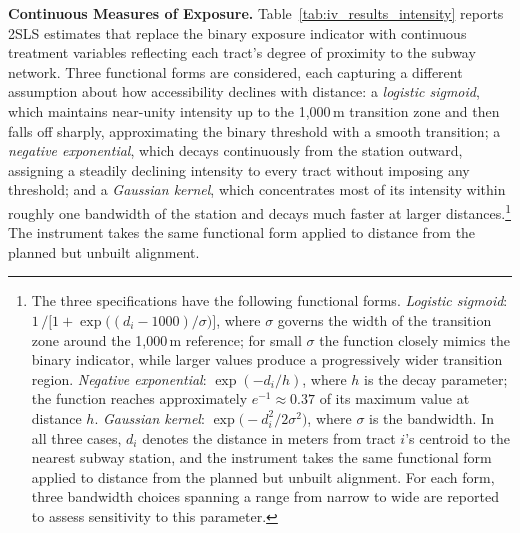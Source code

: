 \noindent
\textbf{Continuous Measures of Exposure.} Table~\ref{tab:iv_results_intensity} reports 2SLS estimates that replace the binary exposure indicator with continuous treatment variables reflecting each tract's degree of proximity to the subway network. Three functional forms are considered, each capturing a different assumption about how accessibility declines with distance: a \textit{logistic sigmoid}, which maintains near-unity intensity up to the 1,000\,m transition zone and then falls off sharply, approximating the binary threshold with a smooth transition; a \textit{negative exponential}, which decays continuously from the station outward, assigning a steadily declining intensity to every tract without imposing any threshold; and a \textit{Gaussian kernel}, which concentrates most of its intensity within roughly one bandwidth of the station and decays much faster at larger distances.\footnote{The three specifications have the following functional forms. \textit{Logistic sigmoid}: $1\,/\bigl[1 + \exp\bigl((d_i - 1000)/\sigma\bigr)\bigr]$, where $\sigma$ governs the width of the transition zone around the 1,000\,m reference; for small $\sigma$ the function closely mimics the binary indicator, while larger values produce a progressively wider transition region. \textit{Negative exponential}: $\exp(-d_i/h)$, where $h$ is the decay parameter; the function reaches approximately $e^{-1} \approx 0.37$ of its maximum value at distance $h$. \textit{Gaussian kernel}: $\exp\!\bigl(-d_i^2/2\sigma^2\bigr)$, where $\sigma$ is the bandwidth. In all three cases, $d_i$ denotes the distance in meters from tract $i$'s centroid to the nearest subway station, and the instrument takes the same functional form applied to distance from the planned but unbuilt alignment. For each form, three bandwidth choices spanning a range from narrow to wide are reported to assess sensitivity to this parameter.} The instrument takes the same functional form applied to distance from the planned but unbuilt alignment.

